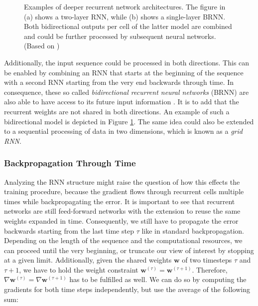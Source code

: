 \begin{figure}[htpb]
\begin{subfigure}{0.3\textwidth}
  \caption{}
  \label{fig:rnn-bidirectional}
\end{subfigure}
\caption[Deep Recurrent Network Architectures]{Examples of deeper recurrent network architectures. The figure in (a) shows a two-layer RNN, while (b) shows a single-layer BRNN. Both bidirectional outputs per cell of the latter model are combined and could be further processed by subsequent neural networks. (Based on \parencite{rnn-effectiveness})}
\label{fig:rnn-advanced}
\end{figure}

Additionally, the input sequence could be processed in both directions. This can be enabled by combining an RNN that starts at the beginning of the sequence with a second RNN starting from the very end backwards through time. In consequence, these so called \textit{bidirectional recurrent neural networks} (BRNN) are also able to have access to its future input information \parencite[p. 394ff.]{deep_learning}. It is to add that the recurrent weights are not shared in both directions. An example of such a bidirectional model is depicted in Figure \ref{fig:rnn-bidirectional}. The same idea could also be extended to a sequential processing of data in two dimensions, which is known as a \textit{grid RNN}.

\subsubsection{Backpropagation Through Time}

Analyzing the RNN structure might raise the question of how this effects the training procedure, because the gradient flows through recurrent cells multiple times while backpropagating the error. It is important to see that recurrent networks are still feed-forward networks with the extension to reuse the same weights expanded in time. Consequently, we still have to propagate the error backwards starting from the last time step $ \tau $ like in standard backpropagation. Depending on the length of the sequence and the computational resources, we can proceed until the very beginning, or truncate our view of interest by stopping at a given limit. Additionally, given the shared weights $ \textbf{w} $ of two timesteps $\tau $ and $ \tau+1 $, we have to hold the weight constraint $ \textbf{w}^{(\tau)} = \textbf{w}^{(\tau+1)} $. Therefore, $ \nabla \textbf{w}^{(\tau)} = \nabla \textbf{w}^{(\tau+1)} $ has to be fulfilled as well. We can do so by computing the gradients for both time steps independently, but use the average of the following sum:

